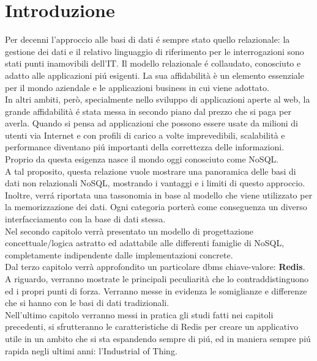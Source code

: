 \chapter*{Introduzione}
Per decenni l'approccio alle basi di dati é sempre stato quello relazionale: la gestione dei dati e il relativo
linguaggio di riferimento per le interrogazioni sono stati punti inamovibili dell'IT.
Il modello relazionale é collaudato, conosciuto e adatto alle applicazioni piú esigenti.
La sua affidabilità è un elemento essenziale per il mondo aziendale e le applicazioni business in cui viene adottato.\\
In altri ambiti, però, specialmente nello sviluppo di applicazioni aperte al web, la grande affidabilità é stata
messa in secondo piano dal prezzo che si paga per averla. Quando si pensa ad applicazioni che possono essere
usate da milioni di utenti via Internet e con profili di carico a volte imprevedibili, scalabilità e performance
diventano piú importanti della correttezza delle informazioni.
Proprio da questa esigenza nasce il mondo oggi conosciuto come NoSQL.\\
A tal proposito, questa relazione vuole mostrare una panoramica delle basi di dati non relazionali NoSQL,
mostrando i vantaggi e i limiti di questo approccio. Inoltre, verrá riportata
una tassonomia in base al modello che viene utilizzato per la memorizzazione dei dati.
Ogni categoria porterà come conseguenza un diverso interfacciamento
con la base di dati stessa.\\
Nel secondo capitolo verrà presentato un modello di progettazione concettuale/logica
astratto ed adattabile alle differenti famiglie di NoSQL, completamente indipendente dalle implementazioni concrete.\\
Dal terzo capitolo verrà approfondito un particolare dbms chiave-valore: \textbf{Redis}.\\
A riguardo, verranno mostrate le principali peculiarità che lo contraddistinguono ed i propri punti di forza.
Verranno messe in evidenza le somiglianze e differenze che si hanno con le basi di dati tradizionali.\\
Nell'ultimo capitolo verranno messi in pratica gli studi fatti nei capitoli precedenti, si sfrutteranno
le caratteristiche di Redis per creare un applicativo utile in un ambito che si sta espandendo sempre di piú, ed in maniera sempre piú rapida
negli ultimi anni: l'Industrial of Thing.
